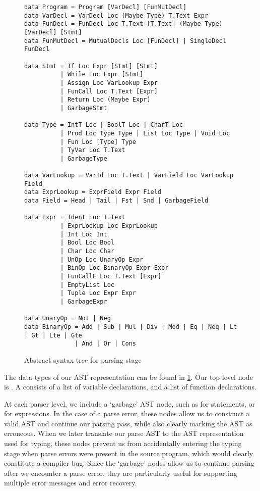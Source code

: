 \begin{figure}
\begin{verbatim}
data Program = Program [VarDecl] [FunMutDecl]
data VarDecl = VarDecl Loc (Maybe Type) T.Text Expr
data FunDecl = FunDecl Loc T.Text [T.Text] (Maybe Type) [VarDecl] [Stmt]
data FunMutDecl = MutualDecls Loc [FunDecl] | SingleDecl FunDecl

data Stmt = If Loc Expr [Stmt] [Stmt]
          | While Loc Expr [Stmt]
          | Assign Loc VarLookup Expr
          | FunCall Loc T.Text [Expr]
          | Return Loc (Maybe Expr)
          | GarbageStmt

data Type = IntT Loc | BoolT Loc | CharT Loc
          | Prod Loc Type Type | List Loc Type | Void Loc
          | Fun Loc [Type] Type
          | TyVar Loc T.Text
          | GarbageType

data VarLookup = VarId Loc T.Text | VarField Loc VarLookup Field
data ExprLookup = ExprField Expr Field
data Field = Head | Tail | Fst | Snd | GarbageField

data Expr = Ident Loc T.Text
          | ExprLookup Loc ExprLookup
          | Int Loc Int
          | Bool Loc Bool
          | Char Loc Char
          | UnOp Loc UnaryOp Expr
          | BinOp Loc BinaryOp Expr Expr
          | FunCallE Loc T.Text [Expr]
          | EmptyList Loc
          | Tuple Loc Expr Expr
          | GarbageExpr

data UnaryOp = Not | Neg
data BinaryOp = Add | Sub | Mul | Div | Mod | Eq | Neq | Lt | Gt | Lte | Gte
              | And | Or | Cons
\end{verbatim}
	\caption{Abstract syntax tree for parsing stage}
  \label{fig:parse-ast}
\end{figure}

The data types of our AST representation can be found in \cref{fig:parse-ast}.
Our top level node is . A  consists of a list
of variable declarations, and a list of function declarations.

At each parser level, we include a `garbage' AST node,
such as  for statements, or  for
expressions. In the case of a parse error, these nodes allow us to construct a
valid AST and continue our parsing pass, while also clearly marking the AST as
erroneous. When we later translate our parse AST to the AST representation used
for typing, these nodes prevent us from accidentally entering the typing stage
when parse errors were present in the source program, which would clearly
constitute a compiler bug.
Since the `garbage' nodes allow us to continue parsing after we encounter a
parse error, they are particularly useful for supporting multiple error messages
and error recovery.

